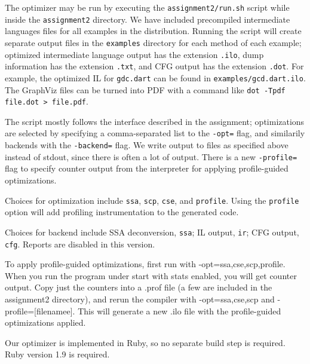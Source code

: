 \documentclass[10pt,twocolumn]{article}
\begin{document}
The optimizer may be run by executing the \texttt{assignment2/run.sh}
script while inside the \texttt{assignment2} directory. We have
included precompiled intermediate languages files for all examples in
the distribution. Running the script will create separate output files
in the \texttt{examples} directory for each method of each example;
optimized intermediate language output has the extension
\texttt{.ilo}, dump information has the extension \texttt{.txt}, and
CFG output has the extension \texttt{.dot}. For example, the optimized
IL for \texttt{gdc.dart} can be found in
\texttt{examples/gcd.dart.ilo}. The GraphViz files can be turned into
PDF with a command like \texttt{dot -Tpdf file.dot > file.pdf}.

The script mostly follows the interface described in the assignment;
optimizations are selected by specifying a comma-separated list to the
\texttt{-opt=} flag, and similarily backends with the
\texttt{-backend=} flag. We write output to files as specified above
instead of stdout, since there is often a lot of output. There is a
new \texttt{-profile=} flag to specify counter output from the
interpreter for applying profile-guided optimizations.

Choices for optimization include \texttt{ssa}, \texttt{scp},
\texttt{cse}, and \texttt{profile}. Using the \texttt{profile} option
will add profiling instrumentation to the generated code.

Choices for backend include SSA deconversion, \texttt{ssa}; IL output,
\texttt{ir}; CFG output, \texttt{cfg}. Reports are disabled in this
version.

To apply profile-guided optimizations, first run with
-opt=ssa,cse,scp,profile. When you run the program under start with
stats enabled, you will get counter output. Copy just the counters
into a .prof file (a few are included in the assignment2 directory),
and rerun the compiler with -opt=ssa,cse,scp and
-profile=[filenamee]. This will generate a new .ilo file with the
profile-guided optimizations applied.

Our optimizer is implemented in Ruby, so no separate build step is
required. Ruby version 1.9 is required. 






\end{document}
